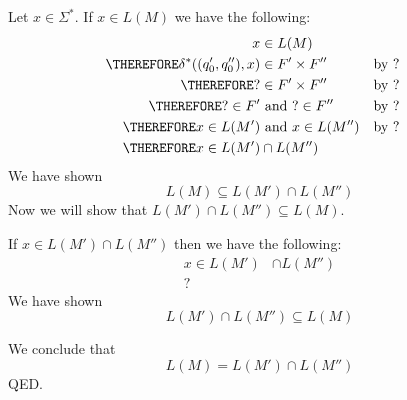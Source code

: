 Let $x \in \Sigma^*$.
If $x\in L(M)$ we have the following:
\begin{align*}
           x &\in L(M)                                                  \\
\THEREFORE \delta^*((q'_0,q''_0), x) &\in F' \times F'' & & \text{by ?} \\
\THEREFORE ? &\in F' \times F''                         & & \text{by ?} \\
\THEREFORE ? \in F' &\text{ and } ? \in F''             & & \text{by ?} \\
\THEREFORE x \in L(M') &\text{ and } x \in L(M'')       & & \text{by ?} \\
\THEREFORE x \in L(M') &\cap L(M'') 
\end{align*}
We have shown
\[
L(M) \subseteq L(M') \cap L(M'')
\]
Now we will show that $L(M') \cap L(M'') \subseteq L(M)$. 

If $x \in L(M') \cap L(M'')$ then we have the following:
\begin{align*}
x \in L(M') &\cap L(M'') \\
? 
\end{align*}
We have shown 
\[
L(M') \cap L(M'') \subseteq L(M)
\]

We conclude that
\[
L(M) = L(M') \cap L(M'')
\]
QED.
\\


